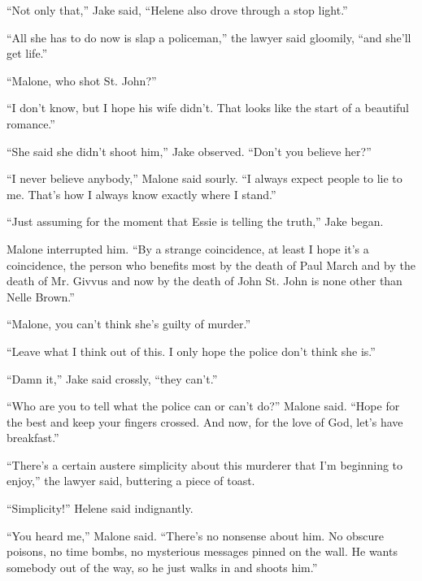 \documentclass{novel}
\begin{document}
“Not only that,” Jake said, “Helene also drove through a stop light.”

“All she has to do now is slap a policeman,” the lawyer said gloomily, “and she’ll get life.”

“Malone, who shot St. John?”

“I don’t know, but I hope his wife didn’t. That looks like the start of a beautiful romance.”

“She said she didn’t shoot him,” Jake observed. “Don’t you believe her?”

“I never believe anybody,” Malone said sourly. “I always expect people to lie to me. That’s how I always know exactly where I stand.”

“Just assuming for the moment that Essie is telling the truth,” Jake began.

Malone interrupted him. “By a strange coincidence, at least I hope it’s a coincidence, the person who benefits most by the death of Paul March and by the death of Mr. Givvus and now by the death of John St. John is none other than Nelle Brown.”

“Malone, you can’t think she’s guilty of murder.”

“Leave what I think out of this. I only hope the police don’t think she is.”

“Damn it,” Jake said crossly, “they can’t.”

“Who are you to tell what the police can or can’t do?” Malone said. “Hope for the best and keep your fingers crossed. And now, for the love of God, let’s have breakfast.”

\begin{ChapterStart}
\vspace{3\nbs}
\end{ChapterStart}

“There’s a certain austere simplicity about this murderer that I’m beginning to enjoy,” the lawyer said, buttering a piece of toast.

“Simplicity!” Helene said indignantly.

“You heard me,” Malone said. “There’s no nonsense about him. No obscure poisons, no time bombs, no mysterious messages pinned on the wall. He wants somebody out of the way, so he just walks in and shoots him.”
\end{document}
